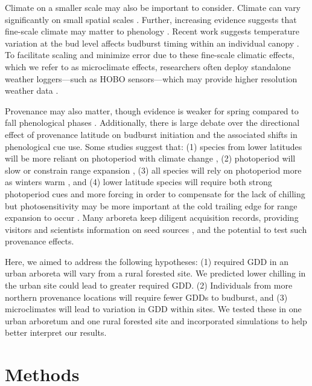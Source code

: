 \documentclass{article}\usepackage[]{graphicx}\usepackage[]{color}
\begin{document}
Climate on a smaller scale may also be important to consider. Climate can vary significantly on small spatial scales \citep[][e.g., as much as 2.6$^{\circ}$C between sensors at the same vineyard or up to 6.6$^{\circ}$C within 1 km spatial units in northern Europe]{deResseguier2020,Lenoir2013}. Further, increasing evidence suggests that fine-scale climate may matter to phenology \citep{Lembrechts2019}. Recent work suggests temperature variation at the bud level affects budburst timing within an individual canopy \citep{Lembrechts2019}. To facilitate scaling and minimize error due to these fine-scale climatic effects, which we refer to as microclimate effects, researchers often deploy standalone weather loggers---such as HOBO sensors---which may provide higher resolution weather data \citep{Schwartz2013a,Whiteman2000}. 
 
Provenance may also matter, though evidence is weaker for spring compared to fall phenological phases \citep{Aitken2015, McKown2013}. Additionally, there is large debate over the directional effect of provenance latitude on budburst initiation and the associated shifts in phenological cue use. Some studies suggest that: (1) species from lower latitudes will be more reliant on photoperiod with climate change \citep{Zohner2016}, (2) photoperiod will slow or constrain range expansion \citep{Saikkonen2012}, (3) all species will rely on photoperiod more as winters warm \citep{Way2015}, and (4) lower latitude species will require both strong photoperiod cues and more forcing in order to compensate for the lack of chilling but photosensitivity may be more important at the cold trailing edge for range expansion to occur \citep{Gauzere2017}. Many arboreta keep diligent acquisition records, providing visitors and scientists information on seed sources \citep{Dosmann2006}, and the potential to test such provenance effects.

Here, we aimed to address the following hypotheses: (1) required GDD in an urban arboreta will vary from a rural forested site. We predicted lower chilling in the urban site could lead to greater required GDD. (2) Individuals from more northern provenance locations will require fewer GDDs to budburst, and (3) microclimates will lead to variation in GDD within sites. We tested these in one urban arboretum and one rural forested site and incorporated simulations to help better interpret our results. 

\section*{Methods}
\end{document}
